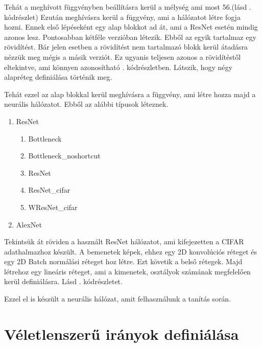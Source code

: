 \documentclass[twoside,a4paper]{refart}
\begin{document}
	{\small }
	
	Tehát a meghívott függvényben beállításra kerül a mélység ami most 56.(lásd . kódrészlet) Ezután meghívásra kerül a függvény, ami a hálózatot létre fogja hozni. Ennek első lépéseként egy alap blokkot ad át, ami a ResNet esetén mindig azonos lesz. Pontosabban kétféle verzióban létezik. Ebből az egyik tartalmaz egy rövidítést. Bár jelen esetben a rövidítést nem tartalmazó blokk kerül átadásra nézzük meg mégis a másik verziót. Ez ugyanis teljesen azonos a rövidítéstől eltekintve, ami könnyen azonosítható . kódrészletben. Látszik, hogy négy alapréteg definiálása történik meg.
	
	{\small }
	
	Tehát ezzel az alap blokkal kerül meghívásra a függvény, ami létre hozza majd a neurális hálózatot. Ebből az alábbi típusok léteznek.
	\begin{enumerate}
		\item ResNet
			\begin{enumerate}
				\item Bottleneck
				\item Bottleneck\_noshortcut
				\item ResNet
				\item ResNet\_cifar
				\item  WResNet\_cifar
			\end{enumerate}
		\item AlexNet
	\end{enumerate}
	
	Tekintsük át röviden a használt ResNet hálózatot, ami kifejezetten a CIFAR adathalmazhoz készült. A bemenetek képek, ehhez egy 2D konvolúciós réteget és egy 2D Batch normálási réteget hoz létre. Ezt követik a belső rétegek. Majd létrehoz egy lineáris réteget, ami a kimenetek, osztályok számának megfelelően kerül definiálásra. Lásd . kódrészletet.
	
	{\small }
	
	Ezzel el is készült a neurális hálózat, amit felhasználunk a tanítás során.
	
\section{Véletlenszerű irányok definiálása}
\end{document}
